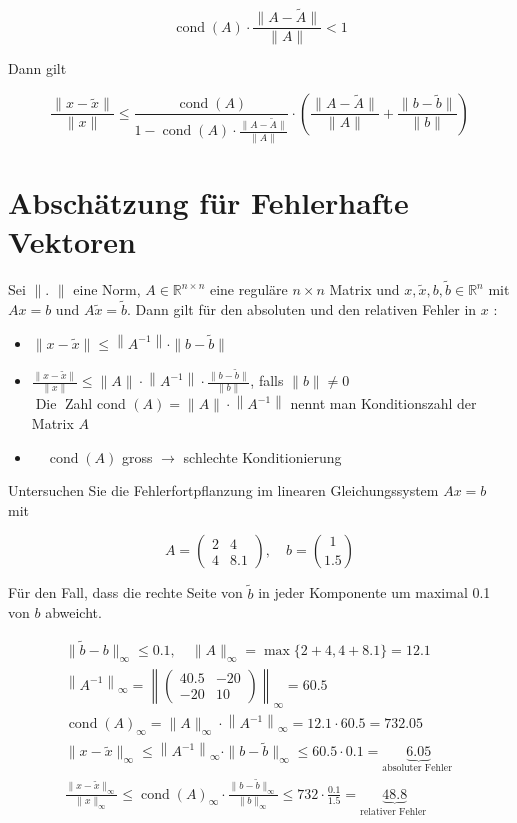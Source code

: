 \documentclass[10pt]{article}
\begin{document}
$$
\operatorname{cond}(A) \cdot \frac{\|A-\tilde{A}\|}{\|A\|}<1
$$

Dann gilt

$$
\frac{\|x-\tilde{x}\|}{\|x\|} \leq \frac{\operatorname{cond}(A)}{1-\operatorname{cond}(A) \cdot \frac{\|A-\tilde{A}\|}{\|A\|}} \cdot\left(\frac{\|A-\tilde{A}\|}{\|A\|}+\frac{\|b-\tilde{b}\|}{\|b\|}\right)
$$

\section*{Abschätzung für Fehlerhafte Vektoren}
Sei $\|$. $\|$ eine Norm, $A \in \mathbb{R}^{n \times n}$ eine reguläre $n \times n$ Matrix und $x, \tilde{x}, b, \tilde{b} \in \mathbb{R}^{n}$ mit $A x=b$ und $A \tilde{x}=\tilde{b}$. Dann gilt für den absoluten und den relativen Fehler in $x$ :

\begin{itemize}
  \item $\|x-\tilde{x}\| \leq\left\|A^{-1}\right\| \cdot\|b-\tilde{b}\|$
  \item $\frac{\|x-\tilde{x}\|}{\|x\|} \leq\|A\| \cdot\left\|A^{-1}\right\| \cdot \frac{\|b-\tilde{b}\|}{\|b\|}$, falls $\|b\| \neq 0$\\
$\operatorname{Die}$ Zahl cond $(A)=\|A\| \cdot\left\|A^{-1}\right\|$ nennt man Konditionszahl der Matrix $A$
  \item $\quad \operatorname{cond}(A)$ gross $\rightarrow$ schlechte Konditionierung
\end{itemize}

Untersuchen Sie die Fehlerfortpflanzung im linearen Gleichungssystem $A x=b$ mit

$$
A=\left(\begin{array}{cc}
2 & 4 \\
4 & 8.1
\end{array}\right), \quad b=\binom{1}{1.5}
$$

Für den Fall, dass die rechte Seite von $\tilde{b}$ in jeder Komponente um maximal 0.1 von $b$ abweicht.

$$
\begin{gathered}
\|\tilde{b}-b\|_{\infty} \leq 0.1, \quad\|A\|_{\infty}=\max \{2+4,4+8.1\}=12.1 \\
\left\|A^{-1}\right\|_{\infty}=\left\|\left(\begin{array}{cc}
40.5 & -20 \\
-20 & 10
\end{array}\right)\right\|_{\infty}=60.5 \\
\operatorname{cond}(A)_{\infty}=\|A\|_{\infty} \cdot\left\|A^{-1}\right\|_{\infty}=12.1 \cdot 60.5=732.05 \\
\|x-\tilde{x}\|_{\infty} \leq\left\|A^{-1}\right\|_{\infty} \cdot\|b-\tilde{b}\|_{\infty} \leq 60.5 \cdot 0.1=\underbrace{6.05}_{\text {absoluter Fehler }} \\
\frac{\|x-\tilde{x}\|_{\infty}}{\|x\|_{\infty}} \leq \operatorname{cond}(A)_{\infty} \cdot \frac{\|b-\tilde{b}\|_{\infty}}{\|b\|_{\infty}} \leq 732 \cdot \frac{0.1}{1.5}=\underbrace{48.8}_{\text {relativer Fehler }}
\end{gathered}
$$
\end{document}
